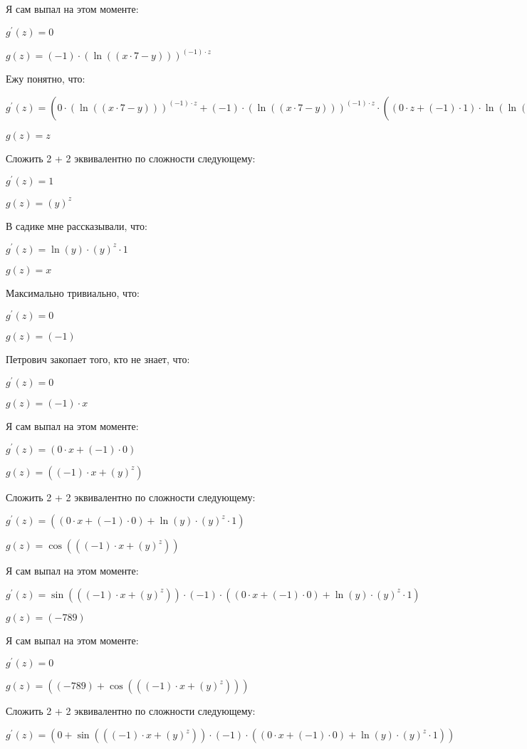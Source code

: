 \documentclass[a4paper,12pt]{article}
\begin{document}
\begin{flushleft}
Я сам выпал на этом моменте:

$g^{'}(z) = 0$

$g(z) = (-1) \cdot (\ln {((x \cdot 7-y))})^{(-1) \cdot z}$

Ежу понятно, что:

$g^{'}(z) = (0 \cdot (\ln {((x \cdot 7-y))})^{(-1) \cdot z}+(-1) \cdot (\ln {((x \cdot 7-y))})^{(-1) \cdot z} \cdot ((0 \cdot z+(-1) \cdot 1) \cdot \ln {(\ln {((x \cdot 7-y))})}+(-1) \cdot z \cdot  \dfrac{1}{\ln {((x \cdot 7-y))}}  \cdot  \dfrac{1}{(x \cdot 7-y)}  \cdot ((0 \cdot 7+x \cdot 0)-0)))$

$g(z) = z$

Сложить 2 + 2 эквивалентно по сложности следующему:

$g^{'}(z) = 1$

$g(z) = (y)^{z}$

В садике мне рассказывали, что:

$g^{'}(z) = \ln {(y)} \cdot (y)^{z} \cdot 1$

$g(z) = x$

Максимально тривиально, что:

$g^{'}(z) = 0$

$g(z) = (-1)$

Петрович закопает того, кто не знает, что:

$g^{'}(z) = 0$

$g(z) = (-1) \cdot x$

Я сам выпал на этом моменте:

$g^{'}(z) = (0 \cdot x+(-1) \cdot 0)$

$g(z) = ((-1) \cdot x+(y)^{z})$

Сложить 2 + 2 эквивалентно по сложности следующему:

$g^{'}(z) = ((0 \cdot x+(-1) \cdot 0)+\ln {(y)} \cdot (y)^{z} \cdot 1)$

$g(z) = \cos {(((-1) \cdot x+(y)^{z}))}$

Я сам выпал на этом моменте:

$g^{'}(z) = \sin {(((-1) \cdot x+(y)^{z}))} \cdot (-1) \cdot ((0 \cdot x+(-1) \cdot 0)+\ln {(y)} \cdot (y)^{z} \cdot 1)$

$g(z) = (-789)$

Я сам выпал на этом моменте:

$g^{'}(z) = 0$

$g(z) = ((-789)+\cos {(((-1) \cdot x+(y)^{z}))})$

Сложить 2 + 2 эквивалентно по сложности следующему:

$g^{'}(z) = (0+\sin {(((-1) \cdot x+(y)^{z}))} \cdot (-1) \cdot ((0 \cdot x+(-1) \cdot 0)+\ln {(y)} \cdot (y)^{z} \cdot 1))$


\end{flushleft}
\end{document}

